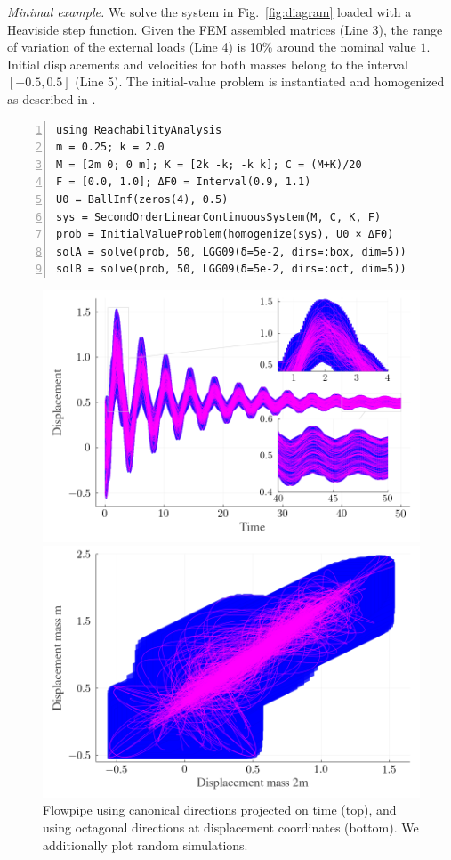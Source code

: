\documentclass{juliacon}
\begin{document}
\noindent \emph{Minimal example.} We solve the system in Fig.~\ref{fig:diagram} loaded with a Heaviside step function.
%
Given the FEM assembled matrices (Line 3), the range of variation of the external loads (Line 4) is 10\% around the nominal value $1$.
%
Initial displacements and velocities for both masses belong to the interval $[-0.5, 0.5]$ (Line 5).
%
The initial-value problem is instantiated and homogenized as described in \cite{forets2021combining}.

\begin{lstlisting}[label=ejemplo, numbers=left, aboveskip=-0.2cm, belowskip=0.8mm]
using ReachabilityAnalysis
m = 0.25; k = 2.0
M = [2m 0; 0 m]; K = [2k -k; -k k]; C = (M+K)/20
F = [0.0, 1.0]; ΔF0 = Interval(0.9, 1.1)
U0 = BallInf(zeros(4), 0.5)
sys = SecondOrderLinearContinuousSystem(M, C, K, F)
prob = InitialValueProblem(homogenize(sys), U0 × ΔF0)
solA = solve(prob, 50, LGG09(δ=5e-2, dirs=:box, dim=5))
solB = solve(prob, 50, LGG09(δ=5e-2, dirs=:oct, dim=5))
\end{lstlisting}

\begin{figure}[tb!]
	\centering
	\includegraphics[width=0.8\linewidth,keepaspectratio]{example/displacement_vs_time}
	
	\includegraphics[width=0.8\linewidth,keepaspectratio]{example/displacement_vs_displacement}
	\caption{Flowpipe using canonical directions projected on time (top), and using octagonal directions at displacement coordinates (bottom). We additionally plot random simulations.}
	\label{fig:example}
\end{figure}
\end{document}
